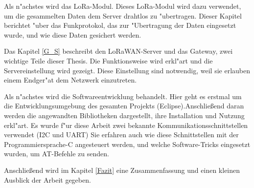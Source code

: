 Als n"achstes wird das LoRa-Modul. Dieses LoRa-Modul 
wird dazu verwendet, um die gesammelten Daten dem 
Server drahtlos zu "ubertragen. Dieser Kapitel 
berichtet "uber das Funkprotokol, das zur "Ubertragung 
der Daten eingesetzt wurde, und wie diese Daten 
gesichert werden.
 
Das Kapitel \ref{G_S} beschreibt den LoRaWAN-Server und 
das Gateway, zwei wichtige Teile dieser Thesis. Die 
Funktionsweise wird erkl"art und die Servereinstellung 
wird gezeigt. Diese Einstellung sind notwendig, weil 
sie erlauben einem Endger"at dem Netzwerk einzutreten.

Als n"achstes wird die Softwareentwicklung behandelt. 
Hier geht es erstmal um die Entwicklungsumgebung des 
gesamten Projekts (Eclipse).Anschlie\ss{}end daran 
werden die angewandten Bibliotheken dargestellt, 
ihre Installation und Nutzung erkl"art. Es wurde f"ur 
diese Arbeit zwei bekannte Kommunikationsschnittstellen 
verwendet (\ac{I2C} und \ac{UART}) Sie erfahren auch wie diese 
Schnittstellen mit der Programmiersprache-C angesteuert 
werden, und welche Software-Tricks eingesetzt wurden, 
um AT-Befehle zu senden.

Anschlie\ss{}end  wird im Kapitel \ref{Fazit} eine 
Zusammenfassung und einen kleinen Ausblick der Arbeit 
gegeben.
   